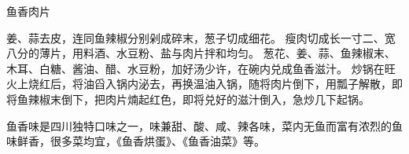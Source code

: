 \begin{recipe}{鱼香肉片}

\begin{ingredients}
\end{ingredients}

\begin{cooking}
\step 姜、蒜去皮，连同鱼辣椒分别剁成碎末，葱子切成细花。
\step 瘦肉切成长一寸二、宽八分的薄片，用料酒、水豆粉、盐与肉片拌和均匀。
\step
葱花、姜、蒜、鱼辣椒末、木耳、白糖、酱油、醋、水豆粉，加好汤少许，在碗内兑成鱼香滋汁。
\step
炒锅在旺火上烧红后，将油舀入锅内泌去，再换温油入锅，随将肉片倒下，用瓢子解散，即将鱼辣椒末倒下，把肉片煵起红色，即将兑好的滋汁倒入，急炒几下起锅。
\end{cooking}

\begin{note}
鱼香味是四川独特口味之一，味兼甜、酸、咸、辣各味，菜内无鱼而富有浓烈的鱼味鲜香，很多菜均宜，《鱼香烘蛋》、《鱼香油菜》等。
\end{note}

\end{recipe}

